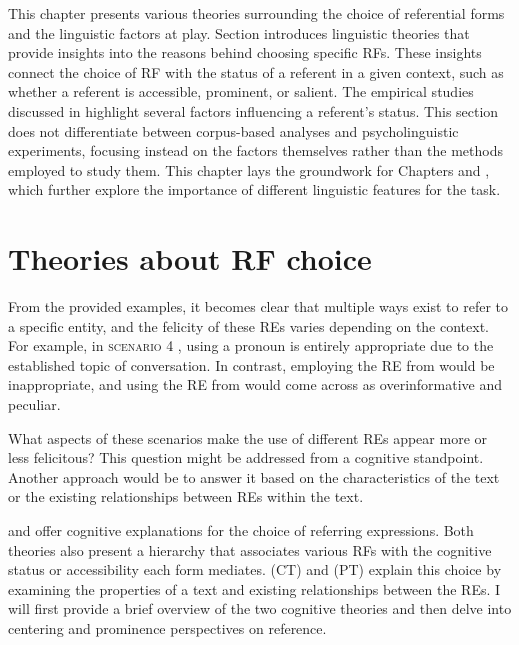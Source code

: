 This chapter presents various theories surrounding the choice of referential forms and the linguistic factors at play.  Section  introduces linguistic theories that provide insights into the reasons behind choosing specific RFs. These insights connect the choice of RF with the status of a referent in a given context, such as whether a referent is accessible, prominent, or salient. The empirical studies discussed in  highlight several factors influencing a referent's status. This section does not differentiate between corpus-based analyses and psycholinguistic experiments, focusing instead on the factors themselves rather than the methods employed to study them.  This chapter lays the groundwork for Chapters \5 and \6, which further explore the importance of different linguistic features for the \context task.


\section{Theories about RF choice}\label{sec:disctheory}

From the provided examples, it becomes clear that multiple ways exist to refer to a specific entity, and the felicity of these REs varies depending on the context. For example, in \textsc{scenario 4} , using a pronoun is entirely appropriate due to the established topic of conversation. In contrast, employing the RE from  would be inappropriate, and using the RE from  would come across as overinformative and peculiar.

What aspects of these scenarios make the use of different REs appear more or less felicitous? This question might be addressed from a cognitive standpoint. Another approach would be to answer it based on the characteristics of the text or the existing relationships between REs within the text. 

 \citep{gundel1993cognitive} and  \citep{ariel1990accessing,ariel2001accessibility} offer cognitive explanations for the choice of referring expressions. Both theories also present a hierarchy that associates various RFs with the cognitive status or accessibility each form mediates.  (CT) \citep{grosz1995centering} and  (PT) \citep{Heusinger2019} explain this choice by examining the properties of a text and existing relationships between the REs. I will first provide a brief overview of the two cognitive theories and then delve into centering and prominence perspectives on reference.

